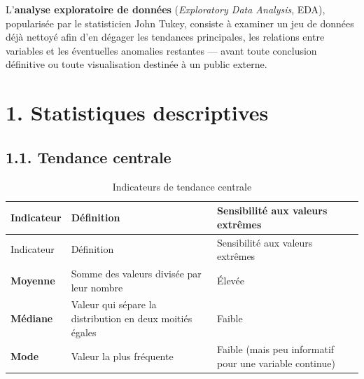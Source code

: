 \documentclass[
  french,
  letterpaper,
  open=any]{scrbook}
\theoremstyle{definition}
\theoremstyle{definition}
\theoremstyle{remark}
\begin{document}
L'\textbf{analyse exploratoire de données} (\emph{Exploratory Data
Analysis}, EDA), popularisée par le statisticien John Tukey, consiste à
examiner un jeu de données déjà nettoyé afin d'en dégager les tendances
principales, les relations entre variables et les éventuelles anomalies
restantes --- avant toute conclusion définitive ou toute visualisation
destinée à un public externe.

\section{1. Statistiques descriptives}\label{statistiques-descriptives}

\subsection{1.1. Tendance centrale}\label{tendance-centrale}

\begin{longtable}[]{@{}
  >{\raggedright\arraybackslash}p{}
  >{\raggedright\arraybackslash}p{}
  >{\raggedright\arraybackslash}p{}@{}}
\caption{Indicateurs de tendance
centrale}\label{tbl-tendance-centrale}\tabularnewline
\toprule\noalign{}
\begin{minipage}[b]{\linewidth}\raggedright
Indicateur
\end{minipage} & \begin{minipage}[b]{\linewidth}\raggedright
Définition
\end{minipage} & \begin{minipage}[b]{\linewidth}\raggedright
Sensibilité aux valeurs extrêmes
\end{minipage} \\
\midrule\noalign{}
\endfirsthead
\toprule\noalign{}
\begin{minipage}[b]{\linewidth}\raggedright
Indicateur
\end{minipage} & \begin{minipage}[b]{\linewidth}\raggedright
Définition
\end{minipage} & \begin{minipage}[b]{\linewidth}\raggedright
Sensibilité aux valeurs extrêmes
\end{minipage} \\
\midrule\noalign{}
\endhead
\bottomrule\noalign{}
\endlastfoot
\textbf{Moyenne} & Somme des valeurs divisée par leur nombre & Élevée \\
\textbf{Médiane} & Valeur qui sépare la distribution en deux moitiés
égales & Faible \\
\textbf{Mode} & Valeur la plus fréquente & Faible (mais peu informatif
pour une variable continue) \\
\end{longtable}
\end{document}
